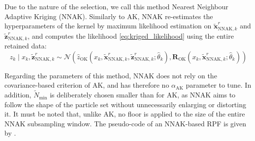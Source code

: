 Due to the nature of the selection, we call this method Nearest Neighbour Adaptive Kriging (NNAK). Similarly to AK, NNAK re-estimates the hyperparameters of the kernel by maximum likelihood estimation on $\tilde{\mathbf{x}}_{\mathrm{NNAK},k}^r$ and $\tilde{\mathbf{z}}_{\mathrm{NNAK},k}^r$, and computes the likelihood \eqref{eq:kriged_likelihood} using the entire retained data:
\begin{equation}
	z_k\mid x_k,\tilde{\mathbf{z}}_{\mathrm{NNAK},k}^r\sim\mathcal{N}\left(\hat{z}_{\mathrm{OK}}\left(x_k,\tilde{\mathbf{x}}_{\mathrm{NNAK},k}^r,\tilde{\mathbf{z}}_{\mathrm{NNAK},k}^r;\hat{\theta}_k\right),\mathbf{R}_{\mathrm{OK}}\left(x_k,\tilde{\mathbf{x}}_{\mathrm{NNAK},k}^r;\hat{\theta}_k\right)\right)\label{eq:NNAK_likelihood}
\end{equation}

Regarding the parameters of this method, NNAK does not rely on the covariance-based criterion of AK, and has therefore no $\alpha_{\mathrm{AK}}$ parameter to tune. In addition, $\tilde{N}_{\min}$ is deliberately chosen smaller than for AK, as NNAK aims to follow the shape of the particle set without unnecessarily enlarging or distorting it. It must be noted that, unlike AK, no floor is applied to the size of the entire NNAK subsampling window. The pseudo-code of an NNAK-based RPF is given by .

